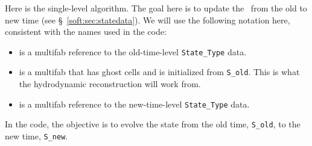 Here is the single-level algorithm.  The goal here is to update the
 \statedata\ from the old to new time (see
\S~\ref{soft:sec:statedata}).  We will use the following notation
here, consistent with the names used in the code:
\begin{itemize}
\item {} is a multifab reference to the old-time-level
  {\tt State\_Type} data.

\item {} is a multifab that has ghost cells and is
  initialized from {\tt S\_old}.  This is what the hydrodynamic
  reconstruction will work from.

\item {} is a multifab reference to the new-time-level
  {\tt State\_Type} data.
\end{itemize}

In the code, the objective is to evolve the state from the old time,
{\tt S\_old}, to the new time, {\tt S\_new}.

